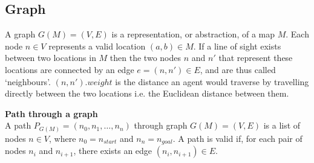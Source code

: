 \documentclass[12pt,notitlepage]{report}
\begin{document}
\subsection{Graph}
A graph $G(M)=(V,E)$ is a representation, or abstraction, of a map $M$. Each node $n \in V$ represents a valid location $(a,b) \in M$. If a line of sight exists between two locations in $M$ then the two nodes $n$ and $n'$ that represent these locations are connected by an edge $e=(n,n') \in E$, and are thus called `neighbours'. $(n,n').weight$ is the distance an agent would traverse by travelling directly between the two locations i.e. the Euclidean distance between them.

\begin{description}
\item{\bfseries Path through a graph}\\
A path $P_{G(M)} = (n_{0}, n_{1}, \ldots, n_{n})$ through graph $G(M)=(V,E)$ is a list of nodes $n \in V$, where $n_{0}=n_{start}$ and $n_{n}=n_{goal}$. A path is valid if, for each pair of nodes $n_{i}$ and $n_{i+1}$, there exists an edge $(n_{i},n_{i+1}) \in E$.\\
\end{description}
\end{document}
